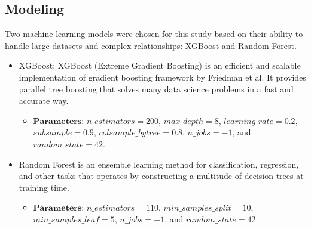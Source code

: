 \documentclass[letterpaper, 10 pt, conference]{ieeeconf}  %
\begin{document}
\subsection{Modeling}
Two machine learning models were chosen for this study based on their ability to handle large datasets and complex relationships: XGBoost and Random Forest.
\begin{itemize}
        \item XGBoost: XGBoost (Extreme Gradient Boosting) is an efficient and scalable implementation of gradient boosting framework by Friedman et al. It provides parallel tree boosting that solves many data science problems in a fast and accurate way.
        \begin{itemize}
                \item $\textbf{Parameters}$: $n\_estimators=200$, $max\_depth=8$, $learning\_rate=0.2$, $subsample=0.9$, $colsample\_bytree=0.8$, $n\_jobs=-1$, and $random\_state=42$.
        \end{itemize}
        \item Random Forest is an ensemble learning method for classification, regression, and other tasks that operates by constructing a multitude of decision trees at training time.
        \begin{itemize}
                \item $\textbf{Parameters}$: $n\_estimators=110$, $min\_samples\_split=10$, $min\_samples\_leaf=5$, $n\_jobs=-1$, and $random\_state=42$.
        \end{itemize}
\end{itemize}
\end{document}
